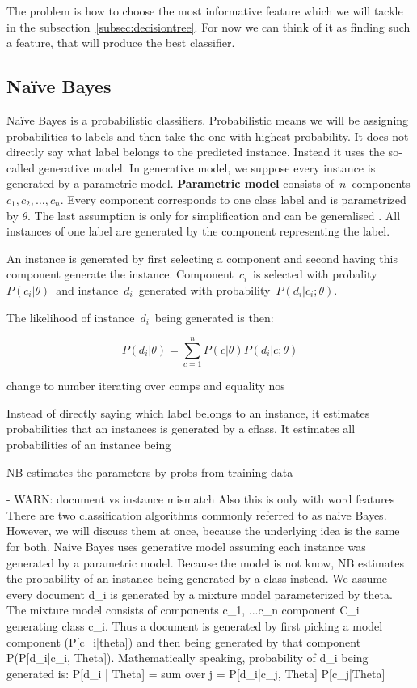 The problem is how to choose the most informative feature which we will tackle in the subsection~\ref{subsec:decisiontree}.
For now we can think of it as finding such a feature, that will produce the best classifier.

\subsection{Na\"{i}ve Bayes}

Na\"{i}ve Bayes is a probabilistic classifiers.
Probabilistic means we will be assigning probabilities to labels and then take the one with highest probability.
It does not directly say what label belongs to the predicted instance.
Instead it uses the so-called generative model.
In generative model, we suppose every instance is generated by a parametric model.
\textbf{Parametric model} consists of~$n$~components $c_1, c_2,\ldots, c_n$.
Every component corresponds to one class label and is parametrized by $\theta$.
The last assumption is only for simplification and can be generalised .
All instances of one label are generated by the component representing the label.

An instance is generated by first selecting a component and second having this component
generate the instance.
Component~$c_i$~is selected with probality~$P\left(c_i|\theta\right)$~and 
instance~$d_i$~generated with probability~$P\left(d_i|c_i;\theta\right)$.

The likelihood of instance~$d_i$~being generated is then:

\begin{equation}
	P\left(d_i|\theta\right) = \sum_{c=1}^{n}{
	P\left(c|\theta\right)
	P\left(d_i|c;\theta\right)
}
\end{equation}

change to number iterating over comps and equality nos


Instead of directly saying which label belongs to an instance,
it estimates probabilities that an instances is generated by a cflass.
It estimates all probabilities of an instance being 

NB estimates the parameters by probs from training data




- WARN: document vs instance mismatch
Also this is only with word features
There are two classification algorithms commonly referred to as naive Bayes. However, we will discuss them at once, because the underlying idea is the same for both.
Naive Bayes uses generative model assuming each instance was generated by a parametric model. Because the model is not know, NB estimates the probability of an instance being generated by a class instead. We assume every document d\_i is generated by a mixture model parameterized by theta. The mixture model consists of components {c\_1, ...c\_n} component C\_i generating class c\_i. Thus a document is generated by first picking a model component (P[c\_i|theta]) and then being generated by that component P(P[d\_i|c\_i, Theta]).
Mathematically speaking, probability of d\_i being generated is:
P[d\_i | Theta] = sum over j = P[d\_i|c\_j, Theta] P[c\_j|Theta]


